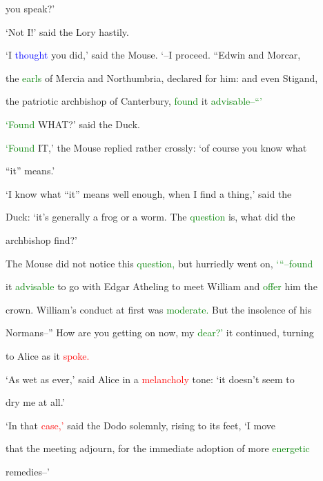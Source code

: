  you speak?’



 ‘Not I!’ said the Lory hastily.



 ‘I \textcolor{blue}{thought} you did,’ said the Mouse. ‘--I proceed. “Edwin and Morcar,

 the \textcolor{green}{earls} of Mercia and Northumbria, declared for him: and even Stigand,

 the patriotic archbishop of Canterbury, \textcolor{green}{found} it \textcolor{green}{advisable--“’}



 \textcolor{green}{‘Found} WHAT?’ said the Duck.



 \textcolor{green}{‘Found} IT,’ the Mouse replied rather crossly: ‘of course you know what

 “it” means.’



 ‘I know what “it” means well enough, when I find a thing,’ said the

 Duck: ‘it’s generally a frog or a \textcolor{BurntOrange}{worm.} The \textcolor{green}{question} is, what did the

 archbishop find?’



 The Mouse did not notice this \textcolor{green}{question,} but hurriedly went on, \textcolor{green}{‘“--found}

 it \textcolor{green}{advisable} to go with Edgar Atheling to meet William and \textcolor{green}{offer} him the

 crown. William’s conduct at first was \textcolor{green}{moderate.} But the insolence of his

 Normans--” How are you getting on now, my \textcolor{green}{dear?’} it continued, turning

 to Alice as it \textcolor{red}{spoke.}



 ‘As wet as ever,’ said Alice in a \textcolor{red}{melancholy} tone: ‘it doesn’t seem to

 dry me at all.’



 ‘In that \textcolor{red}{case,’} said the Dodo solemnly, rising to its feet, ‘I move

 that the meeting adjourn, for the immediate adoption of more \textcolor{green}{energetic}

 \textcolor{BurntOrange}{remedies--’}



